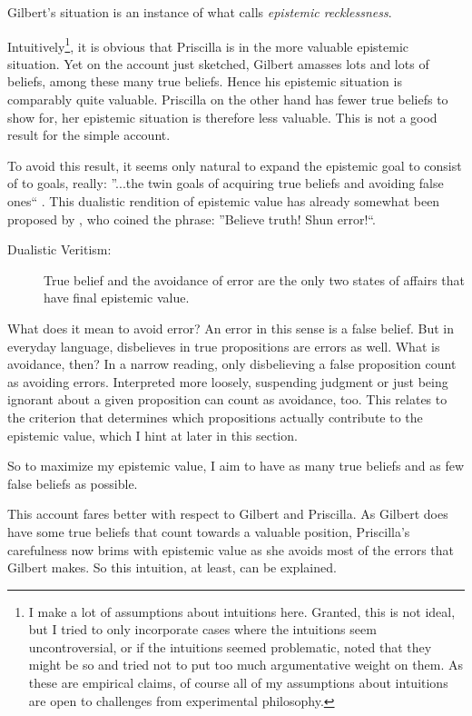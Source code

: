 \documentclass[12pt,numbers=noenddot]{scrartcl}
\begin{document}
Gilbert’s situation is an instance of what \textcite[360]{Berker2013-BERETA-2} calls \emph{epistemic recklessness}.

Intuitively\footnote{I make a lot of assumptions about intuitions here. Granted, this is not ideal, but I tried to only incorporate cases where the intuitions seem uncontroversial, or if the intuitions seemed problematic, noted that they might be so and tried not to put too much argumentative weight on them. As these are empirical claims, of course all of my assumptions about intuitions are open to challenges from experimental philosophy.},
it is obvious that Priscilla is in the more valuable epistemic situation. Yet on the account just sketched, Gilbert amasses lots and lots of beliefs, among these many true beliefs. Hence his epistemic situation is comparably quite valuable. Priscilla on the other hand has fewer true beliefs to show for, her epistemic situation is therefore less valuable. This is not a good result for the simple account.

To avoid this result, it seems only natural to expand the epistemic goal to consist of to goals, really: ”...the twin goals of acquiring true beliefs and avoiding false ones“ \textcite[339]{Berker2013-BERETA-2}. This dualistic rendition of epistemic value has already somewhat been proposed by \textcite[17]{James1896-JAMTWT-19}, who coined the phrase: ”Believe truth! Shun error!“.

\begin{description}
    \item[Dualistic Veritism:] True belief and the avoidance of error are the only two states of affairs that have final epistemic value.
\end{description}

What does it mean to avoid error? An error in this sense \textcite[362]{Berker2013-BERETA-2} is a false belief. But in everyday language, disbelieves in true propositions are errors as well. What is avoidance, then? In a narrow reading, only disbelieving a false proposition count as avoiding errors. Interpreted more loosely, suspending judgment or just being ignorant about a given proposition can count as avoidance, too. This relates to the criterion that determines which propositions actually contribute to the epistemic value, which I hint at later in this section.

So to maximize my epistemic value, I aim to have as many true beliefs and as few false beliefs as possible.

This account fares better with respect to Gilbert and Priscilla. As Gilbert does have some true beliefs that count towards a valuable position, Priscilla’s carefulness now brims with epistemic value as she avoids most of the errors that Gilbert makes. So this intuition, at least, can be explained.
\end{document}

